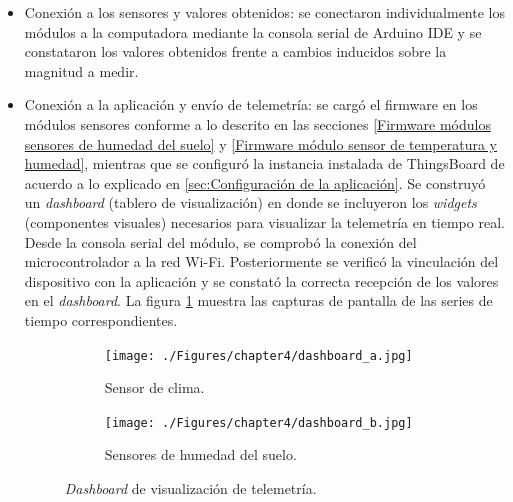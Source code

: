 \begin{itemize}
\item Conexión a los sensores y valores obtenidos: se conectaron individualmente los módulos a la computadora mediante la consola serial de Arduino IDE y se constataron los valores obtenidos frente a cambios inducidos sobre la magnitud a medir.


\item Conexión a la aplicación y envío de telemetría: se cargó el firmware en los módulos sensores conforme a lo descrito en las secciones \ref{Firmware módulos sensores de humedad del suelo} y \ref{Firmware módulo sensor de temperatura y humedad}, mientras que se configuró la instancia instalada de ThingsBoard de acuerdo a lo explicado en \ref{sec:Configuración de la aplicación}. Se construyó un \textit{dashboard} (tablero de visualización) en donde se incluyeron los \textit{widgets} (componentes visuales) necesarios para visualizar la telemetría en tiempo real.
Desde la consola serial del módulo, se comprobó la  conexión del microcontrolador a la red Wi-Fi. Posteriormente se verificó la vinculación del dispositivo con la aplicación y se constató la correcta recepción de los valores en el \textit{dashboard}. La figura \ref{fig:dashboard} muestra las capturas de pantalla de las series de tiempo correspondientes.


\begin{figure}[!h]
     \centering
       \begin{subfigure}[b]{0.90\textwidth}
	    \centering
		 \texttt{[image: ./Figures/chapter4/dashboard\_a.jpg]}
		\caption{Sensor de clima.}
     \end{subfigure}
          \hfill
     \begin{subfigure}[b]{0.90\textwidth}
		\centering
		\texttt{[image: ./Figures/chapter4/dashboard\_b.jpg]}
		\caption{Sensores de humedad del suelo.}
     \end{subfigure}
     \hfill
        \caption[\textit{Dashboard} de visualización de telemetría]{\textit{Dashboard} de visualización de telemetría.}
        \label{fig:dashboard}
\end{figure}



\end{itemize}
